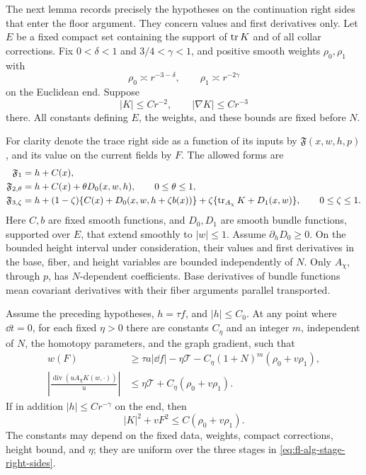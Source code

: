 The next lemma records precisely the hypotheses on the continuation
right sides that enter the floor argument. They concern values and
first derivatives only. Let \(E\) be a fixed compact set containing
the support of \(\operatorname{tr} K\) and of all collar corrections. Fix
\(0<\delta<1\) and \(3/4<\gamma<1\), and positive smooth weights
\(\rho_0,\rho_1\) with
\[
 \rho_0\asymp r^{-3-\delta},\qquad
 \rho_1\asymp r^{-2\gamma}
\]
on the Euclidean end. Suppose
\[
 |K|\le Cr^{-2},\qquad |\nabla K|\le Cr^{-3}
\]
there. All constants defining \(E\), the weights, and these bounds
are fixed before \(N\).

For clarity denote the trace right side as a function of its inputs
by \(\mathfrak F(x,w,h,p)\), and its value on the current fields by
\(F\). The allowed forms are
\begin{align}
 \mathfrak F_1&=h+C(x), \notag\\
 \mathfrak F_{2,\theta}
    &=h+C(x)+\theta D_0(x,w,h), \qquad 0\le\theta\le1,\notag\\
 \mathfrak F_{3,\zeta}
    &=h+(1-\zeta)\{C(x)+D_0(x,w,h+\zeta b(x))\}
       +\zeta\{\operatorname{tr}_{A_\chi}K+D_1(x,w)\},
       \qquad 0\le\zeta\le1 .
 \label{eq:fl-alg-stage-right-sides}
\end{align}
Here \(C,b\) are fixed smooth functions, and
\(D_0,D_1\) are smooth bundle functions, supported over \(E\), that
extend smoothly to \(|w|\le1\).
Assume \(\partial_hD_0\ge0\).
On the bounded height interval under consideration, their values and
first derivatives in the base, fiber, and height variables are
bounded independently of \(N\).
Only \(A_\chi\), through \(p\), has \(N\)-dependent coefficients.
Base derivatives of bundle functions mean covariant derivatives with
their fiber arguments parallel transported.

\begin{lemma}
\label{lem:fl-alg-floor-derivatives}
Assume the preceding hypotheses, \(h=\tau f\), and
\(|h|\le C_0\). At any point where \(\dd t=0\), for each fixed
\(\eta>0\) there are constants \(C_\eta\) and an integer \(m\),
independent of \(N\), the homotopy parameters, and the graph gradient,
such that
\begin{align}
 w(F)&\ge \tau a|\dd f|-\eta\mathcal T
              -C_\eta(1+N)^m(\rho_0+v\rho_1),
       \label{eq:fl-alg-trace-derivative}\\
 \left|\frac{\operatorname{div}(uA_\chi K(w,\cdot))}{u}\right|
      &\le\eta\mathcal T+C_\eta(\rho_0+v\rho_1).
       \label{eq:fl-alg-drift-derivative}
\end{align}
If in addition \(|h|\le Cr^{-\gamma}\) on the end, then
\begin{equation}
 |K|^2+vF^2\le C(\rho_0+v\rho_1).
 \label{eq:fl-alg-weighted-remainder}
\end{equation}
The constants may depend on the fixed data, weights, compact
corrections, height bound, and \(\eta\); they are uniform over the
three stages in \eqref{eq:fl-alg-stage-right-sides}.
\end{lemma}

